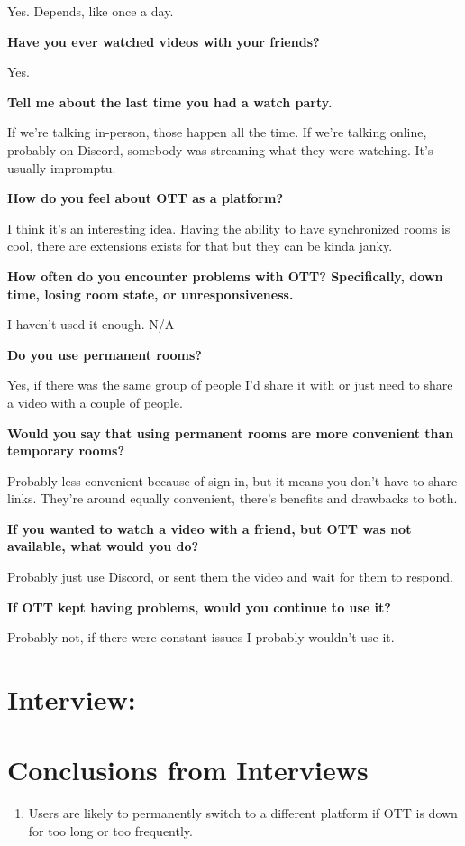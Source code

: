 Yes. Depends, like once a day.

\textbf{Have you ever watched videos with your friends?}

Yes.

\textbf{Tell me about the last time you had a watch party.}

If we're talking in-person, those happen all the time. If we're talking online, probably on Discord, somebody was streaming what they were watching. It's usually impromptu.

\textbf{How do you feel about OTT as a platform?}

I think it's an interesting idea. Having the ability to have synchronized rooms is cool, there are extensions exists for that but they can be kinda janky.

\textbf{How often do you encounter problems with OTT? Specifically, down time, losing room state, or unresponsiveness.}

I haven't used it enough. N/A

\textbf{Do you use permanent rooms?}

Yes, if there was the same group of people I'd share it with or just need to share a video with a couple of people.

\textbf{Would you say that using permanent rooms are more convenient than temporary rooms?}

Probably less convenient because of sign in, but it means you don't have to share links. They're around equally convenient, there's benefits and drawbacks to both.

\textbf{If you wanted to watch a video with a friend, but OTT was not available, what would you do?}

Probably just use Discord, or sent them the video and wait for them to respond.

\textbf{If OTT kept having problems, would you continue to use it?}

Probably not, if there were constant issues I probably wouldn't use it.

\section{Interview: }

\section{Conclusions from Interviews}

\begin{enumerate}
	\item Users are likely to permanently switch to a different platform if OTT is down for too long or too frequently.
\end{enumerate}